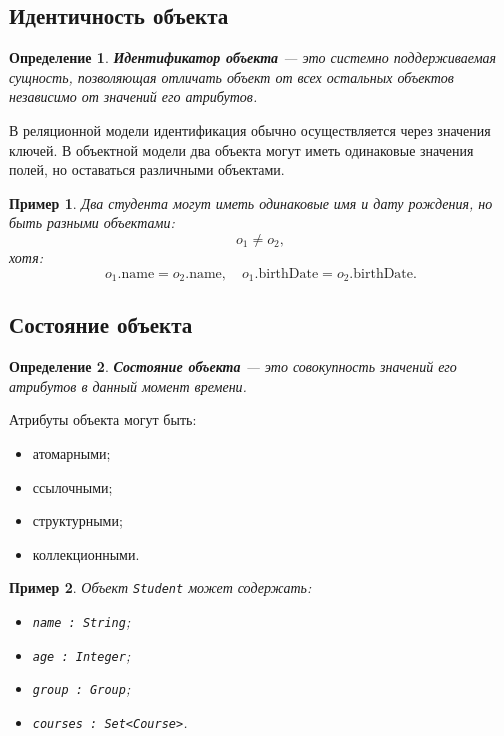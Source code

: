 \documentclass[12pt,a4paper]{article}
\newtheorem{definition}{Определение}[section]
\newtheorem{example}{Пример}[section]
\theoremstyle{remark}
\begin{document}
\subsection{Идентичность объекта}

\begin{definition}
\textbf{Идентификатор объекта} --- это системно поддерживаемая сущность, позволяющая отличать объект от всех остальных объектов независимо от значений его атрибутов.
\end{definition}

В реляционной модели идентификация обычно осуществляется через значения ключей. В объектной модели два объекта могут иметь одинаковые значения полей, но оставаться различными объектами.

\begin{example}
Два студента могут иметь одинаковые имя и дату рождения, но быть разными объектами:
\[
o_1 \neq o_2,
\]
хотя:
\[
o_1.\text{name} = o_2.\text{name},
\quad
o_1.\text{birthDate} = o_2.\text{birthDate}.
\]
\end{example}

\subsection{Состояние объекта}

\begin{definition}
\textbf{Состояние объекта} --- это совокупность значений его атрибутов в данный момент времени.
\end{definition}

Атрибуты объекта могут быть:
\begin{itemize}
    \item атомарными;
    \item ссылочными;
    \item структурными;
    \item коллекционными.
\end{itemize}

\begin{example}
Объект \texttt{Student} может содержать:
\begin{itemize}
    \item \texttt{name : String};
    \item \texttt{age : Integer};
    \item \texttt{group : Group};
    \item \texttt{courses : Set<Course>}.
\end{itemize}
\end{example}
\end{document}
